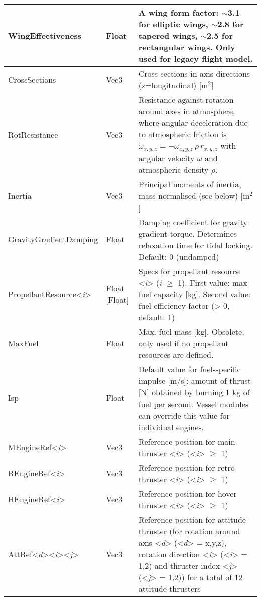 \documentclass[Orbiter Developer Manual.tex]{subfiles}
\begin{document}
\begin{longtable}{ |p{}|p{}|p{}| }
	\hline\rule{0pt}{2ex}
	WingEffectiveness & Float & A wing form factor: $\sim$3.1 for elliptic wings, $\sim$2.8 for tapered wings, $\sim$2.5 for rectangular wings. Only used for legacy flight model.\\
	\hline\rule{0pt}{2ex}
	CrossSections & Vec3 & Cross sections in axis directions (z=longitudinal) [m$^{2}$]\\
	\hline\rule{0pt}{2ex}
	RotResistance & Vec3 & Resistance against rotation around axes in atmosphere, where angular deceleration due to atmospheric friction is $\dot{\omega}_{x,y,z} = -\omega_{x,y,z} \, \rho \, r_{x,y,z}$ with angular velocity $\omega$ and atmospheric density $\rho$.\\
	\hline\rule{0pt}{2ex}
	Inertia & Vec3 & Principal moments of inertia, mass normalised (see below) [m$^{2}$]\\
	\hline\rule{0pt}{2ex}
	GravityGradientDamping & Float & Damping coefficient for gravity gradient torque. Determines relaxation time for tidal locking. Default: 0 (undamped)\\
	\hline\rule{0pt}{2ex}
	PropellantResource<\textit{i}> & Float [Float] & Specs for propellant resource <\textit{i}> (\textit{i} $\geq$ 1). First value: max fuel capacity [kg]. Second value: fuel efficiency factor (> 0, default: 1)\\
	\hline\rule{0pt}{2ex}
	MaxFuel & Float & Max. fuel mass [kg]. Obsolete; only used if no propellant resources are defined.\\
	\hline\rule{0pt}{2ex}
	Isp & Float & Default value for fuel-specific impulse [m/s]: amount of thrust [N] obtained by burning 1 kg of fuel per second. Vessel modules can override this value for individual engines.\\
	\hline\rule{0pt}{2ex}
	MEngineRef<\textit{i}> & Vec3 & Reference position for main thruster <\textit{i}> (<\textit{i}> $\geq$ 1)\\
	\hline\rule{0pt}{2ex}
	REngineRef<\textit{i}> & Vec3 & Reference position for retro thruster <\textit{i}> (<\textit{i}> $\geq$ 1)\\
	\hline\rule{0pt}{2ex}
	HEngineRef<\textit{i}> & Vec3 & Reference position for hover thruster <\textit{i}> (<\textit{i}> $\geq$ 1)\\
	\hline\rule{0pt}{2ex}
	AttRef<\textit{d}><\textit{i}><\textit{j}> & Vec3 & Reference position for attitude thruster (for rotation around axis <\textit{d}> (<\textit{d}> = x,y,z), rotation direction <\textit{i}> (<\textit{i}> = 1,2) and thruster index <\textit{j}> (<\textit{j}> = 1,2)) for a total of 12 attitude thrusters\\

\end{longtable}
\end{document}
